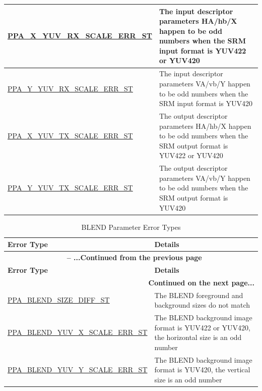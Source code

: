 \documentclass[main\_\_EN.tex]{subfiles}
\begin{document}
\begin{longtable}[c]{ |p{6cm}|p{10cm}| }
        \hyperref[fielddesc:PPAXYUVRXSCALEERRST]{PPA\_X\_YUV\_RX\_SCALE\_ERR\_ST} & The input descriptor parameters HA/hb/X happen to be odd numbers when the SRM input format is YUV422 or YUV420  \\\hline
        \hyperref[fielddesc:PPAYYUVRXSCALEERRST]{PPA\_Y\_YUV\_RX\_SCALE\_ERR\_ST} & The input descriptor parameters VA/vb/Y happen to be odd numbers when the SRM input format is YUV420 \\\hline
        \hyperref[fielddesc:PPAXYUVTXSCALEERRST]{PPA\_X\_YUV\_TX\_SCALE\_ERR\_ST} & The output descriptor parameters HA/hb/X happen to be odd numbers when the SRM output format is YUV422 or YUV420 \\\hline
        \hyperref[fielddesc:PPAYYUVTXSCALEERRST]{PPA\_Y\_YUV\_TX\_SCALE\_ERR\_ST} & The output descriptor parameters VA/vb/Y happen to be odd numbers when the SRM output format is YUV420 \\\hline

\end{longtable}

\begin{longtable}[c]{ |p{6cm}|p{10cm}| }
    \caption{BLEND Parameter Error Types}
    \label{tab:blend_param_err}\\\hline

    \rowcolor{lightgray}
    \textbf{Error Type} & \textbf{Details} \\\hline
    \endfirsthead

    \multicolumn{2}{c}{\bfseries \tablename\ \thetable{} -- ...Continued from the previous page}\\\hline
    \rowcolor{lightgray}
    \textbf{Error Type} & \textbf{Details} \\\hline
    \endhead

    \multicolumn{2}{r}{\textbf{Continued on the next page...}} \\
    \endfoot

    \endlastfoot

        \hyperref[fielddesc:PPABLENDSIZEDIFFST]{PPA\_BLEND\_SIZE\_DIFF\_ST} & The BLEND foreground and background sizes do not match \\\hline
        \hyperref[fielddesc:PPABLENDYUVXSCALEERRST]{PPA\_BLEND\_YUV\_X\_SCALE\_ERR\_ST} & The BLEND background image format is YUV422 or YUV420, the horizontal size is an odd number \\\hline
        \hyperref[fielddesc:PPABLENDYUVYSCALEERRST]{PPA\_BLEND\_YUV\_Y\_SCALE\_ERR\_ST} & The BLEND background image format is YUV420, the vertical size is an odd number \\\hline

\end{longtable}
\end{document}
